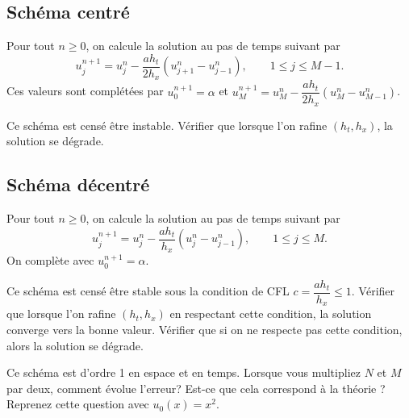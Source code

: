 \documentclass[12pt]{article}
\begin{document}
\subsection{Sch\'ema centr\'e}

Pour tout $n \geq 0$, on calcule la solution au pas de temps suivant par
\begin{equation}
  \label{eq:transport_centre}
  u_j^{n+1} = u_j^n - \dfrac{a h_t}{2 h_x} (u_{j+1}^n - u_{j-1}^n) , \qquad 1 \leq j \leq M-1 .
\end{equation}
Ces valeurs sont compl\'et\'ees par $u_0^{n+1} = \alpha$ et $u_M^{n+1} = u_M^n - \dfrac{a h_t}{2 h_x} (u_{M}^n - u_{M-1}^n)$.

Ce sch\'ema est cens\'e \^etre instable.
V\'erifier que lorsque l'on rafine $(h_t,h_x)$, la solution se d\'egrade.

\subsection{Sch\'ema d\'ecentr\'e}

Pour tout $n \geq 0$, on calcule la solution au pas de temps suivant par
\begin{equation}
  \label{eq:transport_decentre}
  u_j^{n+1} = u_j^n - \dfrac{a h_t}{h_x} (u_{j}^n - u_{j-1}^n) , \qquad 1 \leq j \leq M .
\end{equation}
On compl\`ete avec $u_0^{n+1} = \alpha$.

Ce sch\'ema est cens\'e \^etre stable sous la condition de CFL $c = \dfrac{a h_t}{h_x} \leq 1$.
V\'erifier que lorsque l'on rafine $(h_t,h_x)$ en respectant cette condition,
la solution converge vers la bonne valeur.
V\'erifier que si on ne respecte pas cette condition, alors la solution se d\'egrade.


Ce sch\'ema est d'ordre 1 en espace et en temps.
Lorsque vous multipliez $N$ et $M$ par deux, comment \'evolue l'erreur?
Est-ce que cela correspond \`a la th\'eorie ?
Reprenez cette question avec $u_0(x) = x^2$.


\end{document}
